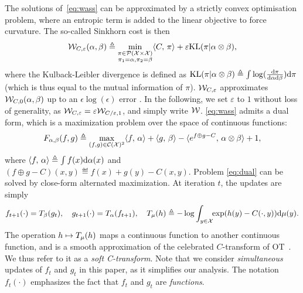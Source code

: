 The solutions of~\eqref{eq:wass} can be approximated by a strictly convex optimisation problem, where an entropic term is added to the linear objective to force curvature. The so-called Sinkhorn cost is then
\begin{equation}\label{eq:wass}
    \mathcal{W}_{C,\varepsilon}(\alpha, \beta) \triangleq 
    \min_{
    \substack{
        \pi \in \mathcal{P}(\mathcal{X} \times \mathcal{X})
        \\\pi_1 = \alpha, \pi_2 = \beta
    }    
    } \langle C,\,\pi\rangle + \varepsilon \textrm{KL}(\pi | \alpha \otimes \beta),
\end{equation}
where the Kulback-Leibler divergence is defined as $\textrm{KL}(\pi | \alpha \otimes
\beta) \triangleq \int \log(\frac{\textrm{d}\pi}{\textrm{d}\alpha\textrm{d}\beta}) \textrm{d}\pi$ (which is thus equal to
the mutual information of $\pi$).
%
$\mathcal{W}_{C,\varepsilon}$ approximates $\mathcal{W}_{C,0}(\alpha,\beta)$ up to an $\epsilon
\log(\epsilon)$ error \citep{2019-Genevay-aistats}. In the following, we set
$\varepsilon$ to $1$ without loss of generality, as $\mathcal{W}_{C, \varepsilon} =
\varepsilon \mathcal{W}_{C / \varepsilon, 1}$, and simply write $\mathcal{W}$.
%
\eqref{eq:wass} admits a dual form, which is a maximization problem over the space of continuous functions:
\begin{equation}\label{eq:dual}
    F_{\alpha, \beta}(f, g) \triangleq \max_{(f, g) \in \mathcal{C}(\mathcal{X})^2} \langle f,\,\alpha\rangle + 
    \langle g,\,\beta\rangle
    - \langle e^{f \oplus g - C},\,\alpha \otimes \beta\rangle + 1, 
\end{equation}
where $\langle f,\,\alpha\rangle \triangleq \int f(x) \textrm{d}\alpha(x)$ and $(f \oplus g - C)(x,y)
\eqdef f(x)+g(y)-C(x,y)$.
Problem \eqref{eq:dual} can be solved by close-form alternated maximization. At iteration $t$, the updates are simply
\begin{equation}
    f_{t+1}(\cdot) = T_{\beta}(g_t), \quad
    g_{t+1}(\cdot) = T_{\alpha}(f_{t+1}),\quad
    T_{\mu}(h) \triangleq 
    - \log \int_{y \in \mathcal{X}}\!\! \exp(h(y) - C(\cdot, y))\textrm{d} \mu(y).\label{eq:sinkhorn}
\end{equation}
The operation $h \mapsto T_{\mu}(h)$  maps a continuous function to another
continuous function, and is a smooth approximation of the celebrated
$C$-transform of OT~\citep{santambrogio2015optimal}. We thus refer to it as a
\textit{soft C-transform}. Note that we consider \textit{simultaneous} updates
of $f_t$ and $g_t$ in this paper, as it simplifies our analysis.
%
The notation $f_t(\cdot)$ emphasizes the fact that $f_t$ and $g_t$ are
\textit{functions}. 
%

